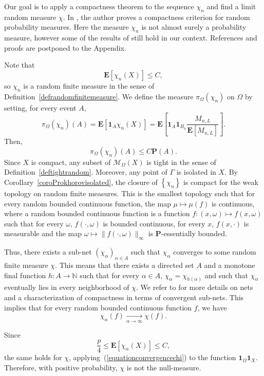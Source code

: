 \documentclass{amsart}
\theoremstyle{definition}
\theoremstyle{remark}
\begin{document}
Our goal is to apply a compactness theorem to the sequence $\chi_n$ and find a limit random measure $\chi$.
In \cite{Crauel}, the author proves a compactness criterion for random probability measures.
Here the measure $\chi_n$ is not almost surely a probability measure, however some of the results of \cite{Crauel} still hold in our context.
References and proofs are postponed to the Appendix.

Note that
$$\mathbf E[\chi_n(X)]\leq C,$$
so $\chi_n$ is a random finite measure in the sense of Definition~\ref{defrandomfinitemeasure}.
We define the measure $\pi_\Omega(\chi_n)$ on $\Omega$ by setting, for every event $A$,
$$\pi_\Omega(\chi_n)(A)=\mathbf E\left [\mathbf 1_A\chi_n(X)\right]=\mathbf E\left [\mathbf 1_A \mathbf 1_{B_n}\frac{M_{n,L}}{\mathbf E[M_{n,L}]}\right ].$$
Then, 
$$\pi_\Omega(\chi_n)(A)\leq C\mathbf P(A).$$
Since $X$ is compact, any subset of $\mathcal{M}_\Omega(X)$ is tight in the sense of Definition~\ref{deftightrandom}.
Moreover, any point of $\Gamma$ is isolated in $X$.
By Corollary~\ref{coroProkhorovisolated}, the closure of $\left \{\chi_n\right \}$ is compact for the weak topology on random finite measures.
This is the smallest topology such that for every random bounded continuous function, the map $\mu\mapsto \mu(f)$ is continuous, where a random bounded continuous function is a function
$f:(x,\omega)\mapsto f(x,\omega)$ such that for every $\omega$, $f(\cdot,\omega)$ is bounded continuous, for every $x$, $f(x,\cdot)$ is measurable and the map $\omega \mapsto \|f(\cdot,\omega)\|_\infty$ is $\mathbf P$-essentially bounded.

Thus, there exists a sub-net $(\chi_\alpha)_{\alpha\in A}$ such that $\chi_{\alpha}$ converges to some random finite measure $\chi$.
This means that there exists a directed set $A$ and a monotone final function $h:A\to \mathbb N$ such that for every $\alpha\in A$,
$\chi_\alpha=\chi_{h(\alpha)}$ and such that $\chi_\alpha$ eventually lies in every neighborhood of $\chi$.
We refer to \cite[Definition~2.11, Definition~2.15, Theorem~2.31]{AliprantisBorder} for more details on nets and a characterization of compactness in terms of convergent sub-nets.
This implies that for every random bounded continuous function $f$, we have
\begin{equation}\label{equationconvergencechi}
\chi_{\alpha}(f)\underset{\alpha\to \infty}{\longrightarrow}\chi(f).
\end{equation}

Since
$$\frac{p}{4}\leq \mathbf E[\chi_{\alpha}(X)]\leq C,$$
the same holds for $\chi$, applying~(\ref{equationconvergencechi}) to the function $\mathbf 1_\Omega\mathbf 1_X$.
Therefore, with positive probability, $\chi$ is not the null-measure.
\end{document}
